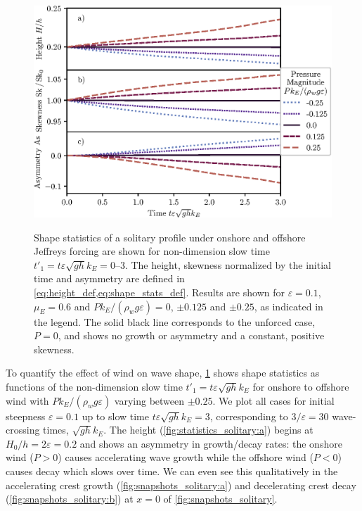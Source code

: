\documentclass{jfm}
\renewcommand*{\epsilon}{\varepsilon}
\begin{document}
\begin{figure}
  \centering
  { %
    \label{fig:statistics_solitary:a}
    \label{fig:statistics_solitary:b}
    \label{fig:statistics_solitary:c}
  }
  \includegraphics{Skew-Asymm-Production.eps}
  \caption{
    Shape statistics of a solitary profile under onshore and offshore
    Jeffreys forcing are shown for non-dimension slow time $t'_1 = t
    \epsilon \sqrt{gh} k_E = \numrange{0}{3}$.
    The
    height,
    skewness normalized by the initial time and
    asymmetry are defined in
    \cref{eq:height_def,eq:shape_stats_def}.
    Results are shown for $\epsilon=0.1$, $\mu_E = 0.6$ and $P
    k_E/(\rho_w g \epsilon) = 0$, $\pm 0.125$ and $\pm 0.25$, as
    indicated in the legend.
    The solid black line corresponds to the unforced case, $P = 0$, and
    shows no growth or asymmetry and a constant, positive skewness.
  }\label{fig:statistics_solitary}
\end{figure}

To quantify the effect of wind on wave shape,
\cref{fig:statistics_solitary} shows shape statistics as functions of
the non-dimension slow time $t'_1 = t \epsilon \sqrt{g h} k_E$ for
onshore to offshore wind with $P k_E/(\rho_w g \epsilon)$ varying
between $\pm 0.25$.
We plot all cases for initial steepness $\epsilon = 0.1$ up to slow time
$t \epsilon \sqrt{g h} k_E = 3$, corresponding to $3/\epsilon = 30$
wave-crossing times, $\sqrt{gh} k_E$.
The height (\cref{fig:statistics_solitary:a}) begins at $H_0/h = 2
\epsilon = 0.2$ and shows an asymmetry in growth/decay rates: the
onshore wind ($P>0$) causes accelerating wave growth while the offshore
wind ($P<0$) causes decay which slows over time.
We can even see this qualitatively in the accelerating crest growth
(\cref{fig:snapshots_solitary:a}) and decelerating crest decay
(\cref{fig:snapshots_solitary:b}) at $x=0$ of
\cref{fig:snapshots_solitary}.
\end{document}
